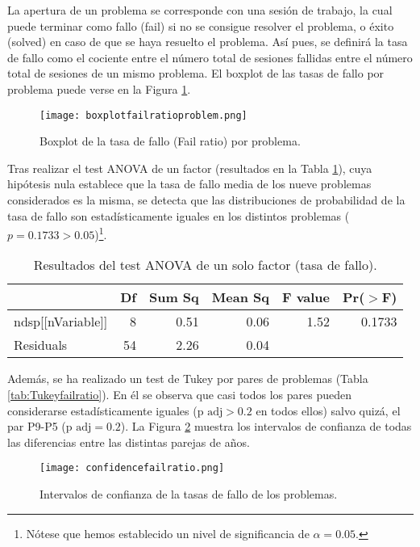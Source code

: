 La apertura de un problema se corresponde con una sesión de trabajo, la cual puede terminar como fallo (fail) si no se consigue resolver el problema, o éxito (solved) en caso de que se haya resuelto el problema. Así pues, se definirá la tasa de fallo como el cociente entre el número total de sesiones fallidas entre el número total de sesiones de un mismo problema. El boxplot de las tasas de fallo por problema puede verse en la Figura \ref{fig:boxplotfailratio}.

\begin{figure}[H]
    \centering
    \texttt{[image: boxplotfailratioproblem.png]}
    \caption{Boxplot de la tasa de fallo (Fail ratio) por problema.}
    \label{fig:boxplotfailratio}
\end{figure}

Tras realizar el test ANOVA de un factor (resultados en la Tabla \ref{tab:ANOVAfailratio}), cuya hipótesis nula establece que la tasa de fallo media de los nueve problemas considerados es la misma, se detecta que las distribuciones de probabilidad de la tasa de fallo son estadísticamente iguales en los distintos problemas ($p = 0.1733 > 0.05$)\footnote{Nótese que hemos establecido un nivel de significancia de $\alpha = 0.05$.}.

\begin{table}[H]
\centering
\caption{Resultados del test ANOVA de un solo factor (tasa de fallo).}
\label{tab:ANOVAfailratio}
\begin{tabular}{lrrrrr}
  \hline
 & Df & Sum Sq & Mean Sq & F value & Pr($>$F) \\ 
  \hline
ndsp[[nVariable]] & 8 & 0.51 & 0.06 & 1.52 & 0.1733 \\ 
  Residuals         & 54 & 2.26 & 0.04 &  &  \\ 
   \hline
\end{tabular}
\end{table}

Además, se ha realizado un test de Tukey por pares de problemas (Tabla \ref{tab:Tukeyfailratio}). En él se observa que casi todos los pares pueden considerarse estadísticamente iguales ($\text{p adj} > 0.2$ en todos ellos) salvo quizá, el par P9-P5 ($\text{p adj} = 0.2$). La Figura \ref{fig:confidenceratiofail} muestra los intervalos de confianza de todas las diferencias entre las distintas parejas de años.

\begin{figure}[H]
    \centering
    \texttt{[image: confidencefailratio.png]}
    \caption{Intervalos de confianza de la tasas de fallo de los problemas.}
    \label{fig:confidenceratiofail}
\end{figure}

